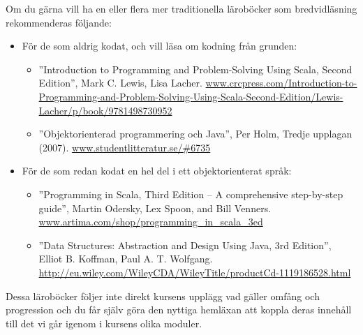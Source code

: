 Om du gärna vill ha en eller flera mer traditionella läroböcker som bredvidläsning rekommenderas följande:
\begin{itemize}[noitemsep, leftmargin=*]
\item För de som aldrig kodat, och vill läsa om kodning från grunden:
\begin{itemize}[nolistsep]
\item ''Introduction to Programming and Problem-Solving Using Scala, Second Edition'', Mark C. Lewis, Lisa Lacher.  {\href{https://www.crcpress.com/Introduction-to-Programming-and-Problem-Solving-Using-Scala-Second-Edition/Lewis-Lacher/p/book/9781498730952}{www.crcpress.com/Introduction-to-Programming-and-Problem-Solving-Using-Scala-Second-Edition/Lewis-Lacher/p/book/9781498730952}}
\item ''Objektorienterad programmering och Java'', Per Holm, Tredje upplagan (2007). \href{https://www.studentlitteratur.se/#6735}{www.studentlitteratur.se/\#6735}
\end{itemize}
\item För de som redan kodat en hel del i ett objektorienterat språk:
\begin{itemize}[nolistsep, noitemsep]
\item ''Programming in Scala, Third Edition -- A comprehensive step-by-step guide'', Martin Odersky, Lex Spoon, and Bill Venners. \\ \href{http://www.artima.com/shop/programming_in_scala_3ed}{www.artima.com/shop/programming\_in\_scala\_3ed} 
\item ''Data Structures: Abstraction and Design Using Java, 3rd Edition'', Elliot B. Koffman, Paul A. T. Wolfgang. \\
\href{http://eu.wiley.com/WileyCDA/WileyTitle/productCd-1119186528.html}{http://eu.wiley.com/WileyCDA/WileyTitle/productCd-1119186528.html}
\end{itemize}
\end{itemize}
Dessa läroböcker följer inte direkt kursens upplägg vad gäller omfång och progression och du får själv göra den nyttiga hemläxan att koppla  deras innehåll till det vi går igenom i kursens olika moduler.

